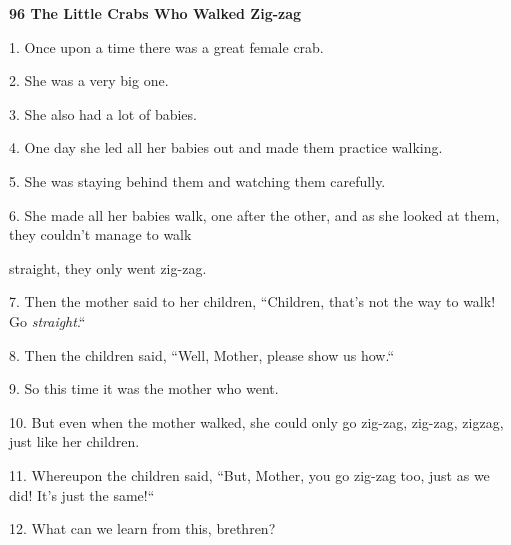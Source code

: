 
\textbf{96 The Little Crabs Who Walked Zig-zag}

1. Once upon a time there was a great female crab.

2. She was a very big one.

3. She also had a lot of babies.

4. One day she led all her babies out and made them practice walking.

5. She was staying behind them and watching them carefully.

6. She made all her babies walk, one after the other, and as she looked at them,
they couldn't manage to walk

straight,  they only went zig-zag.

7. Then the mother said to her children, ``Children, that's not the way
to walk! Go \textit{straight}.``

8. Then the children said, ``Well, Mother, please show us how.``

9. So this time it was the mother who went.

10. But even when the mother walked, she could only go zig-zag, zig-zag, zigzag,
just like her children.

11. Whereupon the children said, ``But, Mother, you go zig-zag too, just
as we did! It's just the same!``

12. What can we learn from this, brethren?


